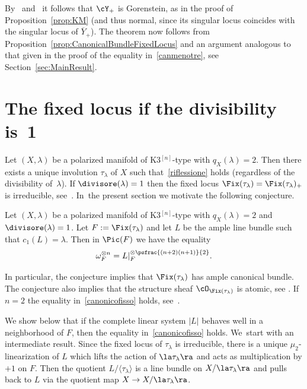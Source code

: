 By~ and~ it follows that $\cY_+$ is Gorenstein, as in the proof of Proposition~\ref{prop:KM} (and thus normal, since its singular locus coincides with the singular locus of $\overline{Y}_+$).
The theorem now follows from Proposition~\ref{prop:CanonicalBundleFixedLocus} and an argument analogous to that given in the proof of the equality in~\eqref{canmenotre}, see Section~\ref{sec:MainResult}.

\section{The fixed locus if the divisibility is~1}\label{sec:poscomp}

Let $(X,\lambda)$ be a polarized \HK manifold of K3$^{[n]}$-type with $q_X(\lambda)=2$.
Then there exists a unique involution $\tau_{\lambda}$ of $X$ such that~\eqref{riflessione} holds (regardless of the divisibility of~$\lambda$). If $\divisore(\lambda)=1$ then the fixed locus $\Fix(\tau_{\lambda})=\Fix(\tau_{\lambda})_+$ is irreducible, see~\cite[Main\,Th.]{involutions1}. In~the present section we motivate the following conjecture.

\begin{conj}\label{conj:GeneralTypeDiv1}
Let $(X,\lambda)$ be a polarized \HK manifold of K3$^{[n]}$-type with \hbox{$q_X(\lambda)\!=\!2$}
and $\divisore(\lambda)=1$.
Let $F:=\Fix(\tau_{\lambda})$ and let $L$ be the ample line bundle such that $c_1(L)=\lambda$.
Then in $\Pic(F)$ we have the equality
\begin{equation}\label{canonicofisso}
\omega_F^{\otimes n}= L|_{F}^{\otimes \psfrac{(n+2)(n+1)}{2}}.
\end{equation}
\end{conj}

In particular, the conjecture implies that $\Fix(\tau_{\lambda})$ has ample canonical bundle. The conjecture also implies that the structure sheaf $\cO_{\Fix(\tau_{\lambda})}$ is atomic, see \cite[Th.\,1.8]{beck:Atomic}.
If $n=2$ the equality in~\eqref{canonicofisso} holds, see~\cite[Th.\,1.1(1)]{Kieran:numhilb2}.

We show below that if the complete linear system $|L|$ behaves well in a neighborhood of $F$, then the equality in~\eqref{canonicofisso} holds. We~start with an intermediate result.
Since the fixed locus of $\tau_{\lambda}$ is irreducible, there is a unique $\mu_2$-linearization of $L$ which lifts the action of $\la\tau_{\lambda}\ra$ and acts as multiplication by $+1$ on $F$. Then the quotient $L/\langle \tau_\lambda\rangle$ is a line bundle on $X/\la\tau_{\lambda}\ra$ and pulls back to $L$ via the quotient map $X\to X/\la\tau_{\lambda}\ra$.

